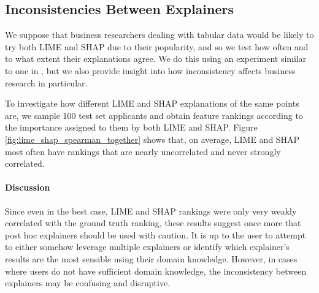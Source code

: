 \documentclass[12pt]{article}    %
\begin{document}
       \subsection*{Inconsistencies Between Explainers}
        \label{sec:conflict_between}
                We suppose that business researchers dealing with tabular data would be likely to try both LIME and SHAP due to their popularity, and so we test how often and to what extent their explanations agree. We do this using an experiment similar to one in \citep{kommiya21towards}, but we also provide insight into how inconsistency affects business research in particular. 
    
            To investigate how different LIME and SHAP explanations of the same points are, we sample 100 test set applicants and obtain feature rankings according to the importance assigned to them by both LIME and SHAP. Figure \ref{fig:lime_shap_spearman_together} shows that, on average, LIME and SHAP most often have rankings that are nearly uncorrelated and never strongly correlated. 

            
            \paragraph{Discussion}
            Since even in the best case, LIME and SHAP rankings were only very weakly correlated with the ground truth ranking, these results suggest once more that post hoc explainers should be used with caution. It is up to the user to attempt to either somehow leverage multiple explainers or identify which explainer's results are the most sensible using their domain knowledge. However, in cases where users do not have sufficient domain knowledge, the inconsistency between explainers may be confusing and disruptive.%

        
\end{document}

